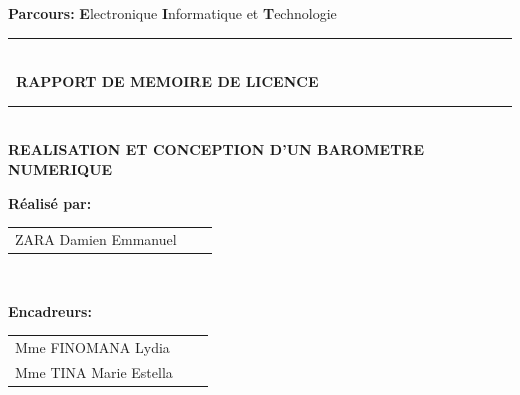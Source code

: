 \documentclass[a4paper,12pt]{report}
\begin{document}
\begin{titlepage}
\begin{center}
\textsc{\Large}
{\large \bfseries Parcours: }
{\large \textbf{E}lectronique \textbf{I}nformatique et \textbf{T}echnologie }\\[1cm]




\rule{\linewidth}{0.2mm} \\[0.4cm]
{ \bfseries\ RAPPORT DE MEMOIRE DE LICENCE \\[0.1cm] }
\rule{\linewidth}{0.2mm} \\[3cm]



\textsc{\huge}
{\huge \bfseries\color{blue} REALISATION ET CONCEPTION D'UN BAROMETRE NUMERIQUE  \\[3cm] }



\begin{minipage}{0.8\textwidth}
  \begin{flushleft} \large
   \begin{center}
    \large \textbf{Réalisé par:}\\
    		\begin{tabular}{l@{\hskip 1cm}l@{\hskip 1cm}l}
				 \textsc{ZARA} Damien Emmanuel    \\
			\end{tabular}\\[1cm]
	\end{center}
	\begin{center}
    \large \textbf{Encadreurs:}\\[2mm]
    		\begin{tabular}{l@{\hskip 1cm}l@{\hskip 1cm}l}
				Mme \textsc{FINOMANA} Lydia    \\
				Mme  \textsc{TINA} Marie Estella \\
			\end{tabular}\\[1cm]
    	
    	\end{center}
    
    
    



\end{flushleft}
\end{minipage}
\end{center}
\end{titlepage}
\end{document}
